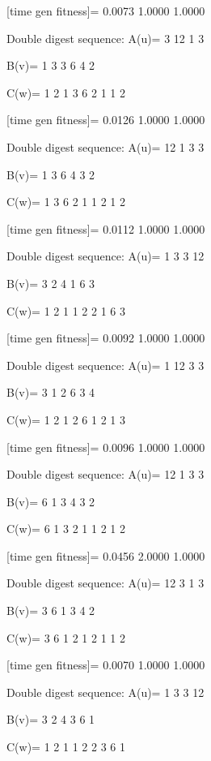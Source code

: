[time gen fitness]=
    0.0073    1.0000    1.0000

Double digest sequence:
A(u)=
     3    12     1     3

B(v)=
     1     3     3     6     4     2

C(w)=
     1     2     1     3     6     2     1     1     2

[time gen fitness]=
    0.0126    1.0000    1.0000

Double digest sequence:
A(u)=
    12     1     3     3

B(v)=
     1     3     6     4     3     2

C(w)=
     1     3     6     2     1     1     2     1     2

[time gen fitness]=
    0.0112    1.0000    1.0000

Double digest sequence:
A(u)=
     1     3     3    12

B(v)=
     3     2     4     1     6     3

C(w)=
     1     2     1     1     2     2     1     6     3

[time gen fitness]=
    0.0092    1.0000    1.0000

Double digest sequence:
A(u)=
     1    12     3     3

B(v)=
     3     1     2     6     3     4

C(w)=
     1     2     1     2     6     1     2     1     3

[time gen fitness]=
    0.0096    1.0000    1.0000

Double digest sequence:
A(u)=
    12     1     3     3

B(v)=
     6     1     3     4     3     2

C(w)=
     6     1     3     2     1     1     2     1     2

[time gen fitness]=
    0.0456    2.0000    1.0000

Double digest sequence:
A(u)=
    12     3     1     3

B(v)=
     3     6     1     3     4     2

C(w)=
     3     6     1     2     1     2     1     1     2

[time gen fitness]=
    0.0070    1.0000    1.0000

Double digest sequence:
A(u)=
     1     3     3    12

B(v)=
     3     2     4     3     6     1

C(w)=
     1     2     1     1     2     2     3     6     1

